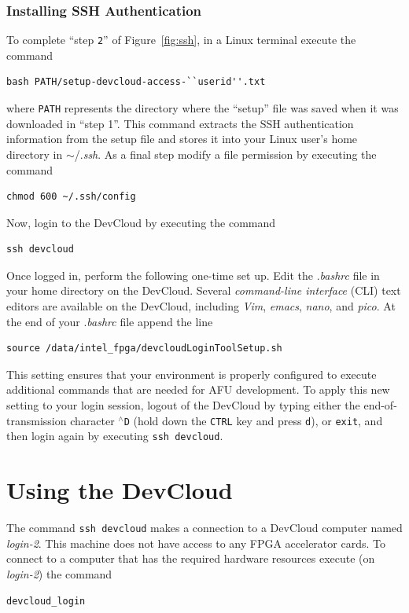 \documentclass[11pt, twoside, pdftex]{article}
\begin{document}
\subsubsection{Installing SSH Authentication} 
\label{sec:ssh}
To complete ``step \texttt{2}'' of Figure~\ref{fig:ssh}, in a Linux terminal execute the command 
\lstset{language=,numbers=none,escapechar=|}
\begin{lstlisting}
bash PATH/setup-devcloud-access-``userid''.txt
\end{lstlisting}

where \texttt{PATH} represents the directory where the ``setup'' file was saved when it was
downloaded in ``step 1''. This command extracts the SSH authentication information from the
setup file and stores it into your Linux user's home directory in $\sim$/.{\it ssh}. As 
a final step modify a file permission by executing the command
\begin{lstlisting}
chmod 600 ~/.ssh/config
\end{lstlisting}

Now, login to the DevCloud by executing the command
\begin{lstlisting}
ssh devcloud
\end{lstlisting}

Once logged in, perform the following one-time set up. Edit the .{\it bashrc} file
in your home directory on the DevCloud. Several {\it command-line interface} (CLI) text 
editors are available on the DevCloud, including {\it Vim}, {\it emacs}, {\it nano}, and 
{\it pico}. At the end of your 
.{\it bashrc} file append the line
\begin{lstlisting}
source /data/intel_fpga/devcloudLoginToolSetup.sh
\end{lstlisting}
This setting ensures that your environment is properly configured to execute additional
commands that are needed for AFU development.  To apply this new setting to your login session, 
logout of the DevCloud by typing either the end-of-transmission character 
$^\wedge$\texttt{D} (hold down the \texttt{CTRL} key and press \texttt{d}), 
or \texttt{exit}, and then login again by executing \texttt{ssh devcloud}.

\section{Using the DevCloud}
The command \texttt{ssh devcloud} makes a connection to a DevCloud computer named {\it login-2}. 
This machine does not have access to any FPGA accelerator cards. To connect to a computer
that has the required hardware resources execute (on {\it login-2}) the command
\begin{lstlisting}
devcloud_login
\end{lstlisting}
\end{document}
